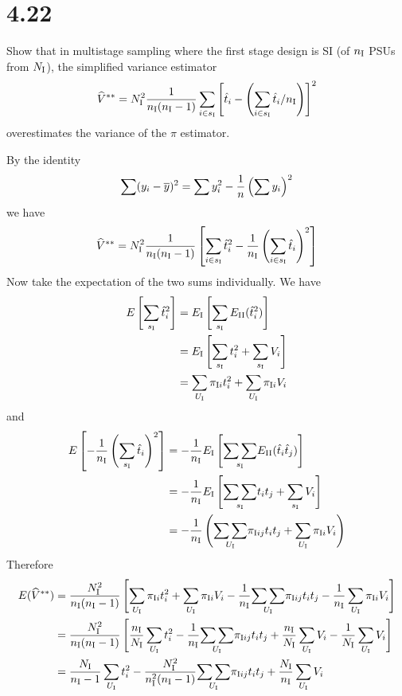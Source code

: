 \documentclass[12pt]{article}
\begin{document}

\section*{4.22}
Show that in multistage sampling where the first stage design is SI
(of $n_{\rm I}$ PSUs from $N_{\rm I}$), the simplified variance estimator
\[
\widehat V^{**}=N_{\rm I}^2{1\over n_{\rm I}(n_{\rm I}-1)}
\sum_{i\in s_{\rm I}}\left[
\hat t_i-\left(\sum_{i\in s_{\rm I}}\hat t_i/n_{\rm I}\right)\right]^2
\]
overestimates the variance of the $\pi$ estimator.

By the identity
\[
\sum(y_i-\overline{y})^2=\sum y_i^2-{1\over n}\left(\sum y_i\right)^2
\]
we have
\[
\widehat V^{**}=N_{\rm I}^2{1\over n_{\rm I}(n_{\rm I}-1)}
\left[\sum_{i\in s_{\rm I}}\hat t_i^2-{1\over n_{\rm I}}\left(\sum_{i\in s_{\rm I}}
\hat t_i\right)^2\right]
\]
Now take the expectation of the two sums individually.
We have
\begin{align*}
E\left[\sum_{s_{\rm I}}\hat t_i^2\right]
&=
E_{\rm I}\left[\sum_{s_{\rm I}}E_{\rm II}(\hat t_i^2)\right]\\
&=
E_{\rm I}\left[
\sum_{s_{\rm I}}t_i^2+\sum_{s_{\rm I}}V_i\right]\\
&=
\sum_{U_{\rm I}}\pi_{\mathrm Ii}t_i^2
+\sum_{U_{\rm I}}\pi_{\mathrm Ii}V_i
\end{align*}
and
%
%
\begin{align*}
E\left[-{1\over n_{\rm I}}\left(\sum_{s_{\rm I}}
\hat t_i\right)^2\right]
&=-{1\over n_{\rm I}}E_{\rm I}\left[
\underset{s_{\rm I}}{\sum\sum}
E_{\rm II}(\hat t_i\hat t_j)\right]\\
&=
-{1\over n_{\rm I}}E_{\rm I}\left[\underset{s_{\rm I}}{\sum\sum}
t_it_j+\sum_{s_{\rm I}}V_i\right]\\
&=-{1\over n_{\rm I}}\left(
\underset{U_{\rm I}}{\sum\sum}
\pi_{\mathrm Iij}t_it_j+\sum_{U_{\rm I}}\pi_{\mathrm Ii}V_i\right)\\
\end{align*}
%
%
%
Therefore
\begin{align*}
E(\widehat V^{**})&=
{N_{\rm I}^2\over n_{\rm I}(n_{\rm I}-1)}\left[
\sum_{U_{\rm I}}\pi_{\mathrm Ii}t_i^2
+\sum_{U_{\rm I}}\pi_{\mathrm Ii}V_i
-{1\over n_{\rm I}}\underset{U_{\rm I}}{\sum\sum}\pi_{\mathrm Iij}t_it_j
-{1\over n_{\rm I}}\sum_{U_{\rm I}}\pi_{\mathrm Ii}V_i
\right]\\
&=
{N_{\rm I}^2\over n_{\rm I}(n_{\rm I}-1)}\left[
{n_{\rm I}\over N_{\rm I}}\sum_{U_{\rm I}}t_i^2
-{1\over n_{\rm I}}\underset{U_{\rm I}}{\sum\sum}\pi_{\mathrm Iij}t_it_j
+{n_{\rm I}\over N_{\rm I}}\sum_{U_{\rm I}}V_i
-{1\over N_{\rm I}}\sum_{U_{\rm I}}V_i
\right]\\
&=
{N_{\rm I}\over n_{\rm I}-1}\sum_{U_{\rm I}}t_i^2
-{N_{\rm I}^2\over n_{\rm I}^2(n_{\rm I}-1)}\underset{U_{\rm I}}{\sum\sum}
\pi_{\mathrm Iij}t_it_j
+{N_{\rm I}\over n_{\rm I}}\sum_{U_{\rm I}}V_i
\end{align*}
\end{document}
